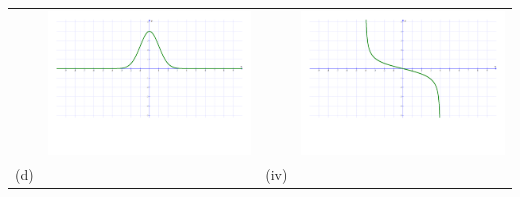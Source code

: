 \documentclass[12pt]{article}
\begin{document}
\begin{enumerate}
\begin{center}
\begin{tabular}{cc|cc}
&\includegraphics[scale=0.22]{match3.pdf} & & \includegraphics[scale=0.22]{matcha.pdf}\\
(d) && (iv)&\\

\end{tabular}
\end{center}
\end{enumerate}
\end{document}
